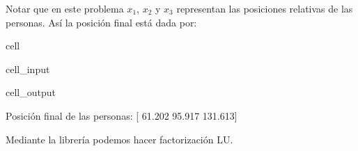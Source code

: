 \documentclass[letterpaper,10pt,english]{jupyterBook}
\begin{document}
\sphinxAtStartPar
Notar que en este problema \(x_1\), \(x_2\) y \(x_3\) representan las posiciones relativas de las personas. Así la posición final está dada por:

\begin{sphinxuseclass}{cell}\begin{sphinxVerbatimInput}

\begin{sphinxuseclass}{cell_input}
\begin{sphinxVerbatim}[commandchars=\\\{\}]
   \PYG{p}{[}  \PYG{p}{]}
\end{sphinxVerbatim}

\end{sphinxuseclass}\end{sphinxVerbatimInput}
\begin{sphinxVerbatimOutput}

\begin{sphinxuseclass}{cell_output}
\begin{sphinxVerbatim}[commandchars=\\\{\}]
Posición final de las personas:  [ 61.202  95.917 131.613]
\end{sphinxVerbatim}

\end{sphinxuseclass}\end{sphinxVerbatimOutput}

\end{sphinxuseclass}
\sphinxAtStartPar
Mediante la librería  podemos hacer factorización LU.
\end{document}
